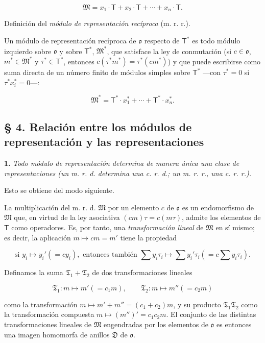 \[
\mathfrak M=x_1\cdot\mathsf T+x_2\cdot\mathsf T+\cdots+x_n\cdot\mathsf T.
\]

Definición del \emph{módulo de representación recíproca} (m. r. r.).

Un módulo de representación recíproca de $\mathfrak{o}$ respecto de $\mathsf T^*$ es todo módulo izquierdo sobre $\mathfrak{o}$ y sobre $\mathsf T^*$, $\mathfrak M^*$, que satisface la ley de conmutación (si $c\in\mathfrak{o}$, $m^*\in\mathfrak M^*$ y $\tau^*\in\mathsf T^*$, entonces $c(\tau^*m^*)=\tau^*(cm^*)$) y que puede escribirse como suma directa de un número finito de módulos simples sobre $\mathsf T^*$ ---con $\tau^*=0$ si $\tau^*x_i^*=0$---:

\[
\mathfrak M^*=\mathsf T^*\cdot x_1^*+\cdots+\mathsf T^*\cdot x_n^*.
\]

\subsection*{§ 4. Relación entre los módulos de representación y las representaciones}

\textbf{1.} \emph{Todo módulo de representación determina de manera única una clase de representaciones (un m. r. d. determina una c. r. d.; un m. r. r., una c. r. r.).}

Esto se obtiene del modo siguiente.

La multiplicación del m. r. d. $\mathfrak M$ por un elemento $c$ de $\mathfrak{o}$ es un endomorfismo de $\mathfrak M$ que, en virtud de la ley asociativa $(cm)\tau=c(m\tau)$, admite los elementos de $\mathsf T$ como operadores. Es, por tanto, una \emph{transformación lineal} de $\mathfrak M$ en sí mismo; es decir, la aplicación $m\mapsto cm=m'$ tiene la propiedad

\[
\text{si }y_i\mapsto y_i'(=cy_i),\text{ entonces también }
\sum y_i\tau_i\mapsto\sum y_i'\tau_i\left(=c\sum y_i\tau_i\right).
\]

Definamos la suma $\mathfrak T_1+\mathfrak T_2$ de dos transformaciones lineales

\[
\mathfrak T_1:m\mapsto m'(=c_1m),\qquad
\mathfrak T_2:m\mapsto m''(=c_2m)
\]

como la transformación $m\mapsto m'+m''=(c_1+c_2)m$, y su producto $\mathfrak T_1\mathfrak T_2$ como la transformación compuesta $m\mapsto(m'')'=c_1c_2m$. El conjunto de las distintas transformaciones lineales de $\mathfrak M$ engendradas por los elementos de $\mathfrak{o}$ es entonces una imagen homomorfa de anillos $\overline{\mathfrak D}$ de $\mathfrak{o}$.

